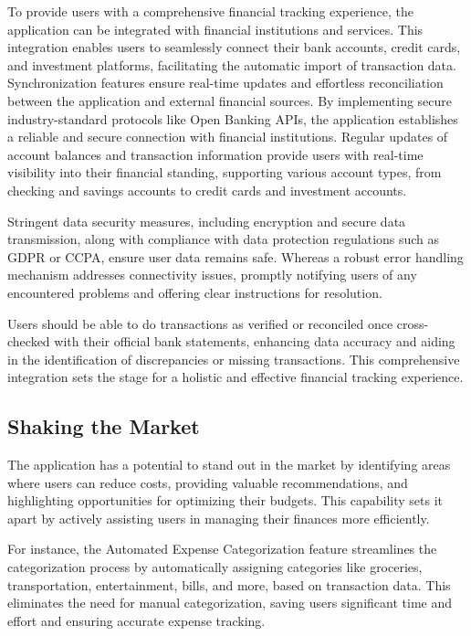 To provide users with a comprehensive financial tracking experience, the application can be integrated with financial 
institutions and services. This integration enables users to seamlessly connect their bank accounts, credit cards, and 
investment platforms, facilitating the automatic import of transaction data. Synchronization features ensure real-time 
updates and effortless reconciliation between the application and external financial sources. By implementing secure 
industry-standard protocols like Open Banking APIs, the application establishes a reliable and secure connection with 
financial institutions. Regular updates of account balances and transaction information provide users with real-time 
visibility into their financial standing, supporting various account types, from checking and savings accounts to 
credit cards and investment accounts. 

Stringent data security measures, including encryption and secure data transmission, along with compliance with data 
protection regulations such as GDPR or CCPA, ensure user data remains safe. Whereas a robust error handling mechanism 
addresses connectivity issues, promptly notifying users of any encountered problems and offering clear instructions for 
resolution. 

Users should be able to do transactions as verified or reconciled once cross-checked with their official bank statements, 
enhancing data accuracy and aiding in the identification of discrepancies or missing transactions. This comprehensive 
integration sets the stage for a holistic and effective financial tracking experience.


\subsection{Shaking the Market}

The application has a potential to stand out in the market by identifying areas where users can reduce costs, 
providing valuable recommendations, and highlighting opportunities for optimizing their budgets. This capability 
sets it apart by actively assisting users in managing their finances more efficiently.

For instance, the Automated Expense Categorization feature streamlines the categorization process by automatically 
assigning categories like groceries, transportation, entertainment, bills, and more, based on transaction data. This 
eliminates the need for manual categorization, saving users significant time and effort and ensuring accurate expense 
tracking.

